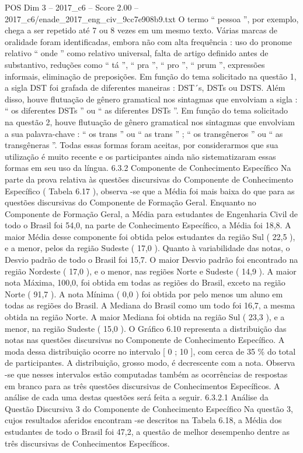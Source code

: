 \begin{textsample}{POS Dim 3 – 2017\_c6 – Score 2.00 – 2017\_c6/enade\_2017\_eng\_civ\_9cc7e908b9.txt}
O termo “ pessoa ”, por exemplo, chega a ser repetido até 7 ou 8 vezes em um mesmo texto.
Várias marcas de oralidade foram identificadas, embora não com alta frequência : uso do pronome relativo “ onde ” como relativo universal, falta de artigo definido antes de substantivo, reduções como “ tá ”, “ pra ”, “ pro ”, “ prum ”, expressões informais, eliminação de preposições.
Em função do tema solicitado na questão 1, a sigla DST foi grafada de diferentes maneiras : DST´s, DSTs ou DSTS.
Além disso, houve flutuação de gênero gramatical nos sintagmas que envolviam a sigla : “ os diferentes DSTs ” ou “ as diferentes DSTs ”.
Em função do tema solicitado na questão 2, houve flutuação de gênero gramatical nos sintagmas que envolviam a sua palavra-chave : “ os trans ” ou “ as trans ” ; “ os transgêneros ” ou “ as transgêneras ”.
Todas essas formas foram aceitas, por considerarmos que sua utilização é muito recente e os participantes ainda não sistematizaram essas formas em seu uso da língua. 6.3.2 Componente de Conhecimento Específico Na parte da prova relativa às questões discursivas do Componente de Conhecimento Específico ( Tabela 6.17 ), observa -se que a Média foi mais baixa do que para as questões discursivas do Componente de Formação Geral.
Enquanto no Componente de Formação Geral, a Média para estudantes de Engenharia Civil de todo o Brasil foi 54,0, na parte de Conhecimento Específico, a Média foi 18,8.
A maior Média desse componente foi obtida pelos estudantes da região Sul ( 22,5 ), e a menor, pelos da região Sudeste ( 17,0 ).
Quanto à variabilidade das notas, o Desvio padrão de todo o Brasil foi 15,7.
O maior Desvio padrão foi encontrado na região Nordeste ( 17,0 ), e o menor, nas regiões Norte e Sudeste ( 14,9 ).
A maior nota Máxima, 100,0, foi obtida em todas as regiões do Brasil, exceto na região Norte ( 91,7 ).
A nota Mínima ( 0,0 ) foi obtida por pelo menos um aluno em todas as regiões do Brasil.
A Mediana do Brasil como um todo foi 16,7, a mesma obtida na região Norte.
A maior Mediana foi obtida na região Sul ( 23,3 ), e a menor, na região Sudeste ( 15,0 ).
O Gráfico 6.10 representa a distribuição das notas nas questões discursivas no Componente de Conhecimento Específico.
A moda dessa distribuição ocorre no intervalo [ 0 ; 10 ], com cerca de 35 \% do total de participantes.
A distribuição, grosso modo, é decrescente com a nota.
Observa -se que nesses intervalos estão computadas também as ocorrências de respostas em branco para as três questões discursivas de Conhecimentos Específicos.
A análise de cada uma destas questões será feita a seguir. 6.3.2.1 Análise da Questão Discursiva 3 do Componente de Conhecimento Específico Na questão 3, cujos resultados aferidos encontram -se descritos na Tabela 6.18, a Média dos estudantes de todo o Brasil foi 47,2, a questão de melhor desempenho dentre as três discursivas de Conhecimentos Específicos.

\end{textsample}
